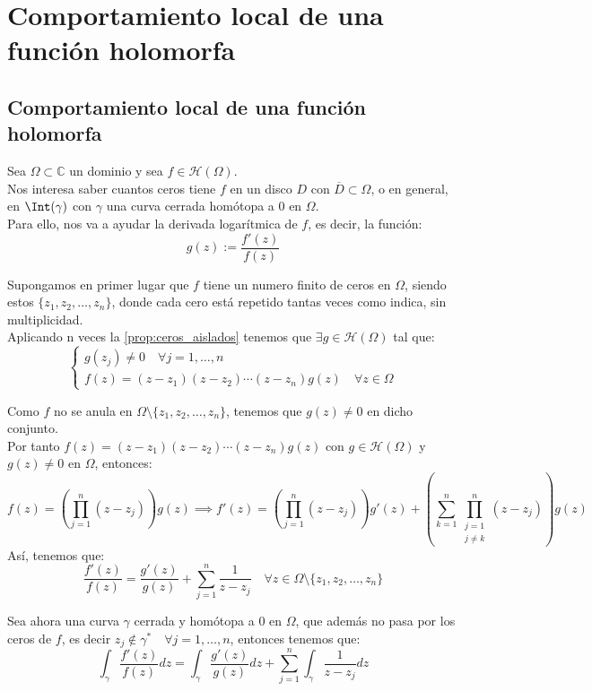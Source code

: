 \section{Comportamiento local de una función holomorfa}
\subsection{Comportamiento local de una función holomorfa}

Sea $\Omega \subset \mathbb{C}$ un dominio y sea $f \in \mathcal{H}(\Omega)$.\\

Nos interesa saber cuantos ceros tiene $f$ en un disco $D$ con $\overline{D} \subset \Omega$, o en general, en $\Int(\gamma)$ con $\gamma$ una curva cerrada homótopa a 0 en $\Omega$.\\

Para ello, nos va a ayudar la derivada logarítmica de $f$, es decir, la función:
\[
g(z) := \frac{f'(z)}{f(z)}
\]

Supongamos en primer lugar que $f$ tiene un numero finito de ceros en $\Omega$, siendo estos $\{ z_1, z_2, \ldots, z_n \}$, donde cada cero está repetido tantas veces como indica, sin multiplicidad.\\

Aplicando n veces la \cref{prop:ceros_aislados} tenemos que $\exists g \in \mathcal{H}(\Omega)$ tal que:
\[
\begin{cases}
    g(z_j) \neq 0 \quad \forall j = 1, \ldots, n \\
    f(z) = (z-z_1)(z-z_2) \cdots (z-z_n) g(z) \quad \forall z \in \Omega
\end{cases}
\]

Como $f$ no se anula en $\Omega \setminus \{ z_1, z_2, \ldots, z_n \}$, tenemos que $g(z) \neq 0$ en dicho conjunto.\\

Por tanto $f(z) = (z-z_1)(z-z_2) \cdots (z-z_n) g(z)$ con $g \in \mathcal{H}(\Omega)$ y $g(z) \neq 0$ en $\Omega$, entonces:
\[
f(z) =
\left( \prod_{j=1}^{n} (z-z_j) \right) g(z) \implies
f'(z) =
\left( \prod_{j=1}^{n} (z-z_j) \right) g'(z) +
\left( \sum_{k=1}^{n} \prod_{\substack{j=1 \\ j \neq k}}^{n} (z-z_j) \right) g(z)
\]
Así, tenemos que:
\[
\frac{f'(z)}{f(z)} =
\frac{g'(z)}{g(z)} + \sum_{j=1}^{n} \frac{1}{z-z_j} \quad \forall z \in \Omega \setminus \{ z_1, z_2, \ldots, z_n \}
\]

Sea ahora una curva $\gamma$ cerrada y homótopa a 0 en $\Omega$, que además no pasa por los ceros de $f$, es decir $z_j \notin \gamma^* \quad \forall j = 1, \ldots, n$, entonces tenemos que:
\[
\int_\gamma \frac{f'(z)}{f(z)} dz =
\int_\gamma \frac{g'(z)}{g(z)} dz + \sum_{j=1}^{n} \int_\gamma \frac{1}{z-z_j} dz
\]

